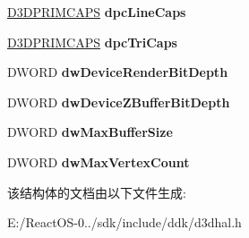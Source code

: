 \begin{DoxyCompactItemize}
\hyperlink{struct___d3_d_prim_caps}{D3\+D\+P\+R\+I\+M\+C\+A\+PS} {\bfseries dpc\+Line\+Caps}
\item 
\mbox{\label{struct___d3_d_device_desc___v1_a4ecabca59791dd03af0dc94f45aeb6ee}} 
\hyperlink{struct___d3_d_prim_caps}{D3\+D\+P\+R\+I\+M\+C\+A\+PS} {\bfseries dpc\+Tri\+Caps}
\item 
\mbox{\label{struct___d3_d_device_desc___v1_ab5d8722ecbc4ab5f4ace7bdd7c5aaabc}} 
D\+W\+O\+RD {\bfseries dw\+Device\+Render\+Bit\+Depth}
\item 
\mbox{\label{struct___d3_d_device_desc___v1_a4a642a93458c892238a2c308fbf25925}} 
D\+W\+O\+RD {\bfseries dw\+Device\+Z\+Buffer\+Bit\+Depth}
\item 
\mbox{\label{struct___d3_d_device_desc___v1_ab138bcdcb4191d9f0cab4ab097b5a80a}} 
D\+W\+O\+RD {\bfseries dw\+Max\+Buffer\+Size}
\item 
\mbox{\label{struct___d3_d_device_desc___v1_ac0b4c8618d324b40be69cfd0c014d2fd}} 
D\+W\+O\+RD {\bfseries dw\+Max\+Vertex\+Count}
\end{DoxyCompactItemize}


该结构体的文档由以下文件生成\+:\begin{DoxyCompactItemize}
\item 
E\+:/\+React\+O\+S-\/0../sdk/include/ddk/d3dhal.\+h\end{DoxyCompactItemize}
